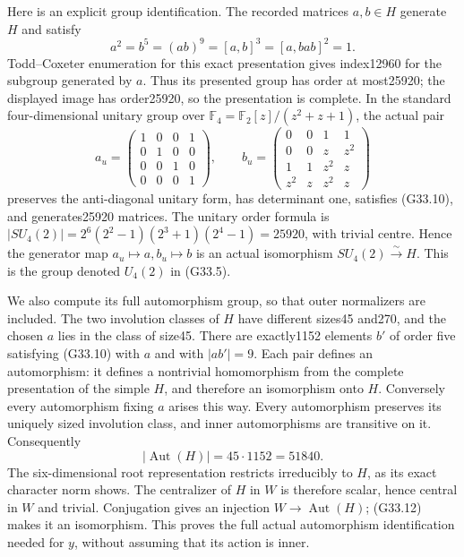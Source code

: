 Here is an explicit group identification. The recorded matrices
\(a,b\in H\) generate \(H\) and satisfy
\[
 a^2=b^5=(ab)^9=[a,b]^3=[a,bab]^2=1.                         \tag{G33.10}
\]
Todd--Coxeter enumeration for this exact presentation gives
index12960 for the subgroup generated by \(a\). Thus its
presented group has order at most25920; the displayed image has
order25920, so the presentation is complete. In the standard
four-dimensional unitary group over
\(\mathbb F_4=\mathbb F_2[z]/(z^2+z+1)\), the actual pair
\[
 a_u=\begin{pmatrix}1&0&0&1\\0&1&0&0\\0&0&1&0\\0&0&0&1\end{pmatrix},
 \qquad
 b_u=\begin{pmatrix}
 0&0&1&1\\0&0&z&z^2\\1&1&z^2&z\\z^2&z&z^2&z
 \end{pmatrix}                                             \tag{G33.11}
\]
preserves the anti-diagonal unitary form, has determinant one,
satisfies (G33.10), and generates25920 matrices. The unitary
order formula is
\(|SU_4(2)|=2^6(2^2-1)(2^3+1)(2^4-1)=25920\), with
trivial centre. Hence the generator map
\(a_u\mapsto a,b_u\mapsto b\) is an actual isomorphism
\(SU_4(2)\xrightarrow{\sim}H\). This is the group denoted
\(U_4(2)\) in (G33.5).

We also compute its full automorphism group, so that outer
normalizers are included. The two involution classes of \(H\)
have different sizes45 and270, and the chosen \(a\) lies in
the class of size45. There are exactly1152 elements \(b'\)
of order five satisfying (G33.10) with \(a\) and with
\(|ab'|=9\). Each pair defines an automorphism: it defines a
nontrivial homomorphism from the complete presentation of the
simple \(H\), and therefore an isomorphism onto \(H\).
Conversely every automorphism fixing \(a\) arises this way.
Every automorphism preserves its uniquely sized involution
class, and inner automorphisms are transitive on it. Consequently
\[
                |\operatorname{Aut}(H)|=45\cdot1152=51840.
                                                               \tag{G33.12}
\]
The six-dimensional root representation restricts irreducibly
to \(H\), as its exact character norm shows. The centralizer
of \(H\) in \(W\) is therefore scalar, hence central in \(W\)
and trivial. Conjugation gives an injection
\(W\to\operatorname{Aut}(H)\); (G33.12) makes it an isomorphism.
This proves the full actual automorphism identification needed
for \(y\), without assuming that its action is inner.


